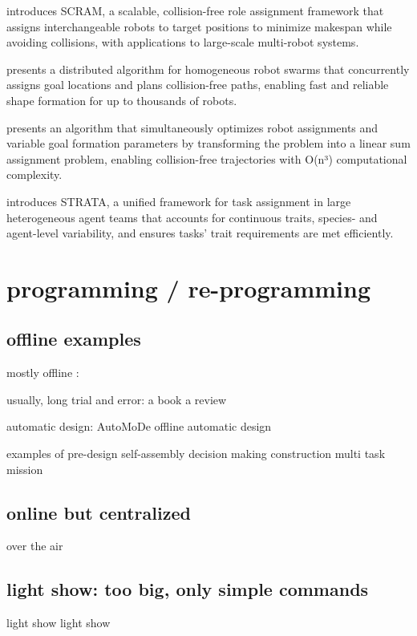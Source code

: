 \cite{macalpine2015scram} introduces SCRAM, a scalable, collision-free role assignment framework that assigns interchangeable robots to target positions to minimize makespan while avoiding collisions, with applications to large-scale multi-robot systems.

\cite{wang2020shape} presents a distributed algorithm for homogeneous robot swarms that concurrently assigns goal locations and plans collision-free paths, enabling fast and reliable shape formation for up to thousands of robots.

\cite{agarwal2018simultaneous} presents an algorithm that simultaneously optimizes robot assignments and variable goal formation parameters by transforming the problem into a linear sum assignment problem, enabling collision-free trajectories with O(n³) computational complexity.

\cite{ravichandar2020strata} introduces STRATA, a unified framework for task assignment in large heterogeneous agent teams that accounts for continuous traits, species- and agent-level variability, and ensures tasks' trait requirements are met efficiently.

\section{programming / re-programming}

\subsection {offline examples}

mostly offline :

usually, long trial and error: 
\cite{hamann2018swarm} a book
\cite{brambilla2013swarm} a review

automatic design:
\cite{francesca2014automode} AutoMoDe
\cite{francesca2016automatic}
\cite{birattari2019automatic} offline automatic design

examples of pre-design
\cite{rubenstein2014programmable} self-assembly
\cite{valentini2016collective} decision making
\cite{werfel2014designing} construction
\cite{dorigo2013swarmanoid} multi task mission

\subsection {online but centralized}
\cite{zyrianoff2024over} over the air
\cite{abadie2024robotap}

\subsection {light show: too big, only simple commands}
\cite{waibel2017drone} light show
\cite{ang2018high} light show

